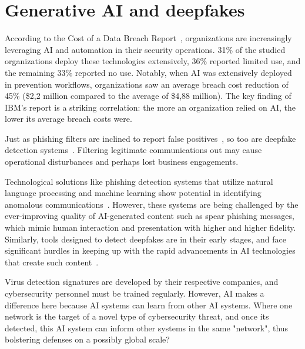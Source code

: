 \section{Generative AI and deepfakes}
\begin{comment}
\end{comment}

According to the Cost of a Data Breach Report~\citep{ibm_Cost_Data_Breach_Report_2024}, organizations are increasingly leveraging AI and automation in their security operations. 31\% of the studied organizations deploy these technologies extensively, 36\% reported limited use, and the remaining 33\% reported no use. Notably, when AI was extensively deployed in prevention workflows, organizations saw an average breach cost reduction of 45\% (\$2,2 million compared to the average of \$4,88 million). The key finding of IBM's report is a striking correlation: the more an organization relied on AI, the lower its average breach costs were.



Just as phishing filters are inclined to report false positives~\citep{fakhouri_AI_Driven_Solutions_SE_Attacks_2024}, so too are deepfake detection systems~\citep{mirsky_Creation_Detection_Deepfakes_2021}. Filtering legitimate communications out may cause operational disturbances and perhaps lost business engagements.

Technological solutions like phishing detection systems that utilize natural language processing and machine learning show potential in identifying anomalous communications~\citep{basit_Comprehensive_Survey_AI_Phishing_Detection_2021}. However, these systems are being challenged by the ever-improving quality of AI-generated content such as spear phishing messages, which mimic human interaction and presentation with higher and higher fidelity. Similarly, tools designed to detect deepfakes are in their early stages, and face significant hurdles in keeping up with the rapid advancements in AI technologies that create such content~\citep{mirsky_Creation_Detection_Deepfakes_2021}.




Virus detection signatures are developed by their respective companies, and cybersecurity personnel must be trained regularly. However, AI makes a difference here because AI systems can learn from other AI systems. Where one network is the target of a novel type of cybersecurity threat, and once its detected, this AI system can inform other systems in the same "network", thus bolstering defenses on a possibly global scale?

